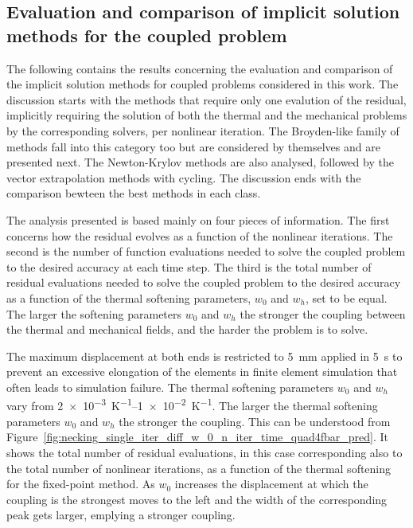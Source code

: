 \begin{figure}
\end{figure}

\FloatBarrier

\subsection{Evaluation and comparison of implicit solution methods for the coupled problem}

The following contains the results concerning the evaluation and comparison of the implicit solution methods for coupled problems considered in this work.
The discussion starts with the methods that require only one evalution of the residual, implicitly requiring the solution of both the thermal and the mechanical problems by the corresponding solvers, per nonlinear iteration.
The Broyden-like family of methods fall into this category too but are considered by themselves and are presented next.
The Newton-Krylov methods are also analysed, followed by the vector extrapolation methods with cycling.
The discussion ends with the comparison bewteen the best methods in each class.

The analysis presented is based mainly on four pieces of information.
The first concerns how the residual evolves as a function of the nonlinear iterations.
The second is the number of function evaluations needed to solve the coupled problem to the desired accuracy at each time step.
The third is the total number of residual evaluations needed to solve the coupled problem to the desired accuracy as a function of the thermal softening parameters, \(w_0\) and \(w_h\), set to be equal.
The larger the softening parameters \(w_0\) and \(w_h\) the stronger the coupling between the thermal and mechanical fields, and the harder the problem is to solve.

The maximum displacement at both ends is restricted to \SI{5}{\milli\meter} applied in \SI{5}{\second} to prevent an excessive elongation of the elements in finite element simulation that often leads to simulation failure.
The thermal softening parameters \(w_0\) and \(w_h\) vary from \SIrange{2e-3}{1e-2}{\kelvin^{-1}}.
The larger the thermal softening parameters \(w_0\) and \(w_h\) the stronger the coupling.
This can be understood from Figure~\ref{fig:necking_single_iter_diff_w_0_n_iter_time_quad4fbar_pred}.
It shows the total number of residual evaluations, in this case corresponding also to the total number of nonlinear iterations, as a function of the thermal softening for the fixed-point method.
As \(w_0\) increases the displacement at which the coupling is the strongest moves to the left and the width of the corresponding peak gets larger, emplying a stronger coupling.

